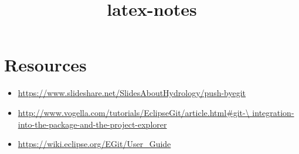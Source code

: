 \documentclass{report}
\title{latex-notes}
\begin{document}
\tableofcontents




\part{Resources}

\begin{itemize}
  \item \url{https://www.slideshare.net/SlidesAboutHydrology/push-byegit}
  \item \url{http://www.vogella.com/tutorials/EclipseGit/article.html#git-\
  integration-into-the-package-and-the-project-explorer}
  \item \url{https://wiki.eclipse.org/EGit/User_Guide}
\end{itemize}
\end{document}

